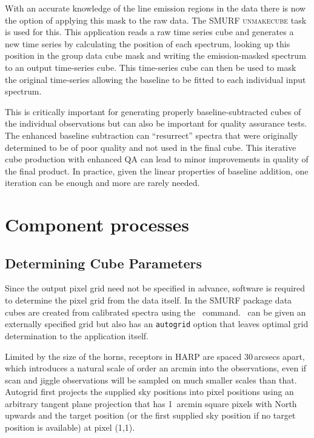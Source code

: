 \documentclass[final,authoryear,5p,times,twocolumn]{elsarticle}
\begin{document}
With an accurate knowledge of the line emission regions in the data
there is now the option of applying this mask to the raw data. The
SMURF \textsc{unmakecube} task is used for this. This application
reads a raw time series cube and generates a new time series by
calculating the position of each spectrum, looking up this position in
the group data cube mask and writing the emission-masked spectrum to
an output time-series cube. This time-series cube can then be used to
mask the original time-series allowing the baseline to be fitted to
each individual input spectrum.

This is critically important for generating properly
baseline-subtracted cubes of the individual observations but can also
be important for quality assurance tests. The enhanced baseline
subtraction can ``resurrect'' spectra that were originally determined
to be of poor quality and not used in the final cube. This iterative
cube production with enhanced QA can lead to minor improvements in
quality of the final product.  In practice, given the linear
properties of baseline addition, one iteration can be enough and more
are rarely needed.



\section{Component processes}

\subsection{Determining Cube Parameters}
\label{sec:makecube}

Since the output pixel grid need not be specified in advance, software
is required to determine the pixel grid from the data itself. In the
SMURF package data cubes are created from calibrated spectra using the
\makecube\ command. \makecube\ can be given an externally specified
grid but also has an \texttt{autogrid} option that leaves optimal grid
determination to the application itself.

Limited by the size of the horns, receptors in HARP are spaced
30\,arcsecs apart, which introduces a natural scale of order an arcmin
into the observations, even if scan and jiggle observations will be
sampled on much smaller scales than that. Autogrid first projects the
supplied sky positions into pixel positions using an arbitrary tangent
plane projection that has 1~arcmin square pixels with North upwards
and the target position (or the first supplied sky position if no
target position is available) at pixel (1,1).
\end{document}
